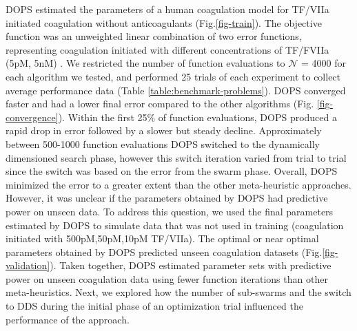 \documentclass[12pt]{article}
\begin{document}
DOPS estimated the parameters of a human coagulation model for TF/VIIa initiated coagulation without anticoagulants (Fig.\ref{fig-train}).
The objective function was an unweighted linear combination of two error functions,
representing coagulation initiated with different concentrations of TF/FVIIa (5pM, 5nM) \cite{hockin2002model}.
We restricted the number of function evaluations to $\mathcal{N}$ = 4000 for each algorithm we tested, and performed 25 trials of each experiment to collect average performance data (Table \ref{table:benchmark-problems}). DOPS converged faster and had a lower final error compared to the other algorithms (Fig. \ref{fig-convergence}).
Within the first 25\% of function evaluations, DOPS produced a rapid drop in error followed by a slower but steady decline.
Approximately between 500-1000 function evaluations DOPS switched to the dynamically dimensioned search phase, however this switch iteration varied from trial to trial since the switch was based on the error from the swarm phase. Overall, DOPS minimized the error to a greater extent than the other meta-heuristic approaches.
However, it was unclear if the parameters obtained by DOPS had predictive power on unseen data. To address this question, we used the final parameters estimated by
DOPS to simulate data that was not used in training (coagulation initiated with 500pM,50pM,10pM TF/VIIa).
The optimal or near optimal parameters obtained by DOPS predicted unseen coagulation datasets (Fig.\ref{fig-validation}).
Taken together, DOPS estimated parameter sets with predictive power on unseen coagulation data using fewer function iterations than other meta-heuristics.
Next, we explored how the number of sub-swarms and the switch to DDS during the initial phase of an optimization trial influenced the performance of the approach.
\end{document}
